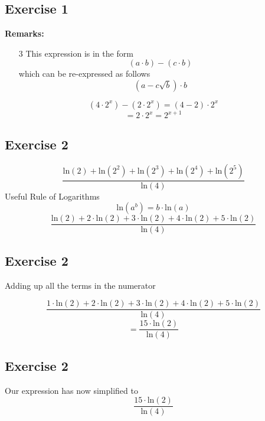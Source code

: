 \documentclass[]{report}
\begin{document}
\begin{enumerate}
\subsection{Exercise 1}


\textbf{Remarks:}
\begin{itemize}
\item[3] This expression is in the form 
\[ (a  \cdot b ) - ( c  \cdot b) \]
which can be re-expressed as follows 
\[ (a - c\sqrt{b} )  \cdot b \]
\end{itemize}
\[ (4 \cdot 2^x) -  (2\cdot 2^{x}) = (4-2)  \cdot 2^{x} \]
\[   = 2 \cdot 2^x = 2^{x+1}\]

\subsection{Exercise 2}


\[  \frac{\mbox{ln}(2) + \mbox{ln}(2^2) + \mbox{ln}(2^3)  + \mbox{ln}(2^4) + \mbox{ln}(2^5)  }  {\mbox{ln}(4)}  \]
Useful Rule of Logarithms
\[  \mbox{ln}(a^b)  = b\cdot \mbox{ln}(a)  \]
\[  \frac{\mbox{ln}(2) + 2 \cdot \mbox{ln}(2) + 3 \cdot\mbox{ln}(2)  + 4 \cdot \mbox{ln}(2) + 5 \cdot \mbox{ln}(2)  }  {\mbox{ln}(4)}  \]
\subsection{Exercise 2}

Adding up all the terms in the numerator

\[  \frac{1\cdot\mbox{ln}(2) + 2 \cdot \mbox{ln}(2) + 3 \cdot\mbox{ln}(2)  + 4 \cdot \mbox{ln}(2) + 5 \cdot \mbox{ln}(2)  }  {\mbox{ln}(4)} \]  \[= \frac{15 \cdot \mbox{ln}(2) }{\mbox{ln}(4)} \]



\subsection{Exercise 2}

Our expression has now simplified to 
\[\frac{15 \cdot \mbox{ln}(2) }{\mbox{ln}(4)} \]


\end{enumerate}
\end{document}

